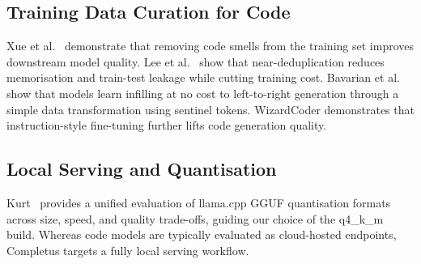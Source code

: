 \subsection{Training Data Curation for Code}

Xue et al.~\cite{Xue2025CleanCode} demonstrate that removing code
smells from the training set improves downstream model quality. Lee et
al.~\cite{Lee2021Dedup} show that near-deduplication reduces
memorisation and train-test leakage while cutting training cost.
Bavarian et al.~\cite{Bavarian2022FIM} show that models learn
infilling at no cost to left-to-right generation through a simple data
transformation using sentinel tokens. WizardCoder
\cite{Luo2023WizardCoder} demonstrates that instruction-style
fine-tuning further lifts code generation quality.

\subsection{Local Serving and Quantisation}

Kurt~\cite{Kurt2026Quant} provides a unified evaluation of llama.cpp
GGUF quantisation formats across size, speed, and quality
trade-offs, guiding our choice of the q4\_k\_m build. Whereas code
models are typically evaluated as cloud-hosted endpoints, Completus
targets a fully local serving workflow.
